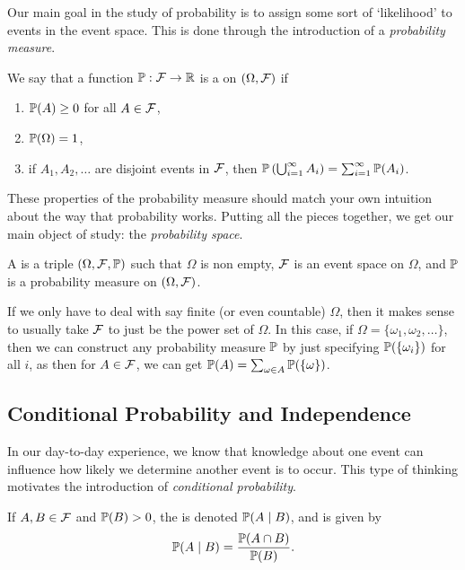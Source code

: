 \documentclass[a4paper]{scrartcl}
\begin{document}
Our main goal in the study of probability is to assign some sort of `likelihood' to events in the event space. This is done through the introduction of a \emph{probability measure}.


\begin{definition}
	We say that a function $\mathbb{P} : \mathcal{F} \rightarrow \mathbb{R}$ is a  on $(\Omega, \mathcal{F})$ if
	\begin{enumerate}
		\item $\mathbb{P}(A) \geq 0$ for all $A \in \mathcal{F}$,
		\item $\mathbb{P}(\Omega) = 1$,
		\item if $A_1, A_2, \dots$ are disjoint events in $\mathcal{F}$, then $\mathbb{P}\left(\bigcup_{i = 1}^{\infty} A_i\right) = \sum_{i = 1}^{\infty} \mathbb{P}(A_i)$.
	\end{enumerate} 
\end{definition}

These properties of the probability measure should match your own intuition about the way that probability works. Putting all the pieces together, we get our main object of study: the \emph{probability space}.

\begin{definition}
	A  is a triple $(\Omega, \mathcal{F}, \mathbb{P})$ such that $\Omega$ is non empty, $\mathcal{F}$ is an event space on $\Omega$, and $\mathbb{P}$ is a probability measure on $(\Omega, \mathcal{F})$.
\end{definition}


If we only have to deal with say finite (or even countable) $\Omega$, then it makes sense to usually take $\mathcal{F}$ to just be the power set of $\Omega$. In this case, if $\Omega = \{\omega_1, \omega_2, \dots \}$, then we can construct any probability measure $\mathbb{P}$ by just specifying $\mathbb{P}(\{\omega_i\})$ for all $i$, as then for $A \in \mathcal{F}$, we can get $\mathbb{P}(A) = \sum_{\omega \in A} \mathbb{P}(\{\omega\})$. 

\subsection{Conditional Probability and Independence}

In our day-to-day experience, we know that knowledge about one event can influence how likely we determine another event is to occur. This type of thinking motivates the introduction of \emph{conditional probability}.

\begin{definition}
	If $A, B \in \mathcal{F}$ and $\mathbb{P}(B) > 0$, the  is denoted $\mathbb{P}(A \mid B)$, and is given by
	$$
	\mathbb{P}(A \mid B) = \frac{\mathbb{P}(A \cap B)}{\mathbb{P}(B)}.
	$$
\end{definition}
\end{document}
